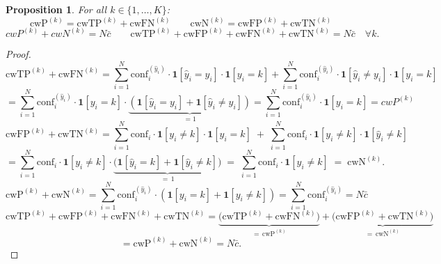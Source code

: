 \documentclass{article}
\theoremstyle{plain}
\newtheorem{theorem}{Proposition}
\theoremstyle{definition}
\theoremstyle{remark}
\begin{document}
\begin{theorem} \label{proposition:cw_basic_relations}
For all $k \in \{1, \ldots, K\}$: \[
\text{cwP}^{(k)} = \text{cwTP}^{(k)} + \text{cwFN}^{(k)} \quad \quad \text{cwN}^{(k)} = \text{cwFP}^{(k)} + \text{cwTN}^{(k)}
\]   \[
cwP^{(k)} + cwN^{(k)} = N\bar{c}    \quad \quad   \text{cwTP}^{(k)} + \text{cwFP}^{(k)} + \text{cwFN}^{(k)} + \text{cwTN}^{(k)} = N\bar c \quad \forall k.
\] 
\end{theorem}
\begin{proof}
\[\text{cwTP}^{(k)} + \text{cwFN}^{(k)} = \sum_{i=1}^N \text{conf}_i^{(\hat{y}_i)} \cdot \mathbf{1}[\hat{y}_i = y_i] \cdot \mathbf{1}[y_i=k] + \sum_{i=1}^N \text{conf}_i^{(\hat{y}_i)} \cdot \mathbf{1}[\hat{y}_i \neq y_i] \cdot \mathbf{1}[y_i=k] \] \[= \sum_{i=1}^N \text{conf}_i^{(\hat{y}_i)} \cdot \mathbf{1}[y_i=k] \cdot \underbrace{(\mathbf{1}[\hat{y}_i = y_i] + \mathbf{1}[\hat{y}_i \neq y_i])}_{=1} = \sum_{i=1}^N \text{conf}_i^{(\hat{y}_i)} \cdot \mathbf{1}[y_i=k] = cwP^{(k)}  \] 
\[
\text{cwFP}^{(k)} + \text{cwTN}^{(k)} = \sum_{i=1}^N \text{conf}_i \cdot \mathbf{1}[y_i \neq k]\cdot \mathbf{1}[\hat y_i = k] \;+\; \sum_{i=1}^N \text{conf}_i \cdot \mathbf{1}[y_i \neq k]\cdot \mathbf{1}[\hat y_i \neq k] \]\[
= \sum_{i=1}^N \text{conf}_i \cdot \mathbf{1}[y_i \neq k] \cdot \underbrace{\big(\mathbf{1}[\hat y_i = k] + \mathbf{1}[\hat y_i \neq k]\big)}_{=\,1} \;=\; \sum_{i=1}^N \text{conf}_i \cdot \mathbf{1}[y_i \neq k] \;=\; \text{cwN}^{(k)}. \]
 \[
\text{cwP}^{(k)} + \text{cwN}^{(k)} = \sum_{i=1}^N \text{conf}_i^{(\hat{y}_i)} \cdot (\mathbf{1}[y_i=k] + \mathbf{1}[y_i\neq k]) = \sum_{i=1}^N \text{conf}_i^{(\hat{y}_i)} = N\bar{c} 
\] \[
\text{cwTP}^{(k)} + \text{cwFP}^{(k)} + \text{cwFN}^{(k)} + \text{cwTN}^{(k)} = \underbrace{\big(\text{cwTP}^{(k)} + \text{cwFN}^{(k)}\big)}_{=\,\text{cwP}^{(k)}} + \underbrace{\big(\text{cwFP}^{(k)} + \text{cwTN}^{(k)}\big)}_{=\,\text{cwN}^{(k)}}  \]\[
= \text{cwP}^{(k)} + \text{cwN}^{(k)} = N\bar c. \]
\end{proof}
\bigskip
\end{document}

